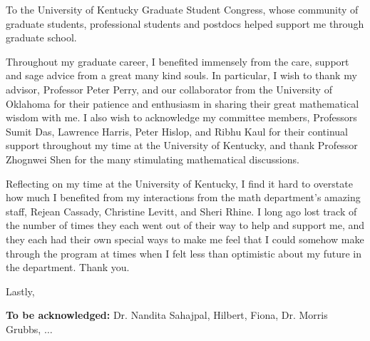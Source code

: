 \documentclass[final, leqno]{ukthesis}
\numberwithin{equation}{chapter}
\begin{document}
\frontmatter
\maketitle
\begin{dedication}
	To the University of Kentucky Graduate Student Congress, whose community of graduate students, 
	professional students and postdocs helped support me through graduate school.
\end{dedication}
\begin{acknowledgments}
	Throughout my graduate career, I benefited immensely from the care, support and 
	sage advice from a great many kind souls. In particular, I wish to thank my advisor, 
	Professor Peter Perry, and our collaborator from the University of Oklahoma for
	their patience and enthusiasm in sharing their great mathematical wisdom with me.
	I also wish to acknowledge my committee members, Professors Sumit Das, Lawrence 
	Harris, Peter Hislop, and Ribhu Kaul for their continual support throughout my 
	time at the University of Kentucky, and thank Professor Zhognwei Shen 
	for the many stimulating mathematical discussions.

	Reflecting on my time at the University of Kentucky, I find it hard to overstate 
	how much I benefited from my interactions from the math department's amazing 
	staff, Rejean Cassady, Christine Levitt, and Sheri Rhine. I long ago lost 
	track of the number of times they each went out of their way to help and 
	support me, and they each had their own special ways to make me feel that 
	I could somehow make through the program at times when I felt less
	than optimistic about my future in the department. Thank you.

	Lastly, 

	\textbf{To be acknowledged:} {\color{red} Dr. Nandita Sahajpal, 
	Hilbert, Fiona, Dr. Morris Grubbs, $\ldots$}
\end{acknowledgments}

\begin{KeepFromToc}
	\tableofcontents\clearpage
\end{KeepFromToc}
\listoffigures\clearpage




\mainmatter
\end{document}
